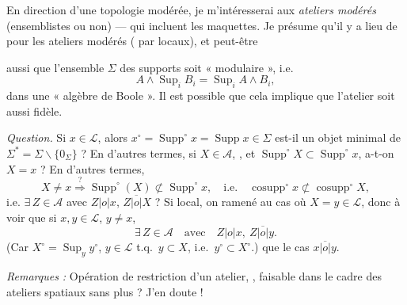 \documentclass[11pt,a4paper]{article}
\begin{document}
En direction d'une topologie modérée, je m'intéresserai aux \emph{ateliers modérés} (ensemblistes ou non) --- qui incluent les maquettes. Je présume qu'il y a lieu de  pour les ateliers modérés \ill{}  ( \ill{} par  locaux), et peut-être



aussi que l'ensemble $\Sigma$  des supports soit « modulaire », i.e.
\[
  A \wedge \operatorname{Sup}_i B_i = \operatorname{Sup}_i A \wedge B_i ,
\]
dans une « algèbre de Boole ». Il est possible que cela implique que l'atelier soit aussi fidèle.


\emph{Question.} Si $x \in \mathcal{L}$, alors $x^{\circ} = \operatorname{Supp}^{\circ} x = \operatorname{Supp} x \in \Sigma$ est-il un objet minimal de $\Sigma^{*} = \Sigma \smallsetminus \{0_{\Sigma}\}$ ? En d'autres termes, si $X \in \mathcal{A}$, , et $\operatorname{Supp}^{\circ} X \subset \operatorname{Supp}^{\circ} x$, a-t-on $X = x$ ? En d'autres termes,
\[
  X \neq x \overset{?}{\Longrightarrow} \operatorname{Supp}^{\circ}(X) \not\subset \operatorname{Supp}^{\circ} x ,
  \quad \text{i.e.} \quad \operatorname{cosupp}^{\circ} x \not\subset \operatorname{cosupp}^{\circ} X ,
\]
i.e. $\exists\, Z \in \mathcal{A}$ avec $Z \mathrel{|o|} x$, $Z \mathrel{\overline{|o|}} X$ ? Si  local, on  ramené au cas où $X = y \in \mathcal{L}$, donc à voir que si $x, y \in \mathcal{L}$, $y \neq x$,
\[
  \exists\, Z \in \mathcal{A} \quad \text{avec} \quad Z \mathrel{|o|} x ,\ Z \mathrel{\overline{|o|}} y .
\]
(Car $X^{\circ} = \operatorname{Sup}_{y} y^{\circ}$, $y \in \mathcal{L}$ t.q.\ $y \subset X$, i.e.\ $y^{\circ} \subset X^{\circ}$.)  que  le cas $x \mathrel{\overline{|o|}} y$.

\emph{Remarques :} Opération de restriction d'un atelier, , faisable dans le cadre des ateliers spatiaux sans plus ? J'en doute !
\end{document}
